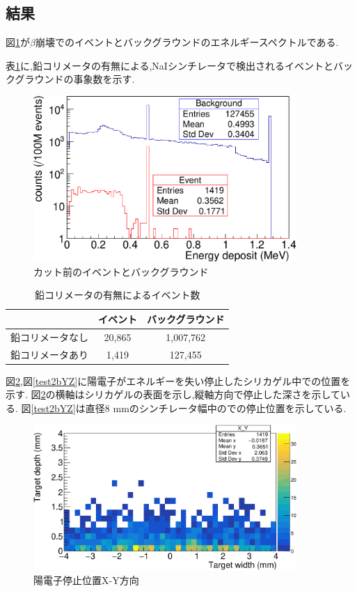 \subsection{結果}

図\ref{test2}が$\beta$崩壊でのイベントとバックグラウンドのエネルギースペクトルである.

表\ref{table_test2}に,鉛コリメータの有無による,NaIシンチレータで検出されるイベントとバックグラウンドの事象数を示す.


\begin{figure}[htbp]
	\centering
		\includegraphics[width=10cm]{fig/test2.pdf}
	\caption{カット前のイベントとバックグラウンド}
	\label{test2}
\end{figure}

\begin{table}[htbp]
	\centering
	\caption{鉛コリメータの有無によるイベント数}
		\label{table_test2}	
	  \begin{tabular}{ccc} 
		\hline
		   				&イベント& バックグラウンド \\ 
		\hline \hline
		鉛コリメータなし & 20,865 & 1,007,762 \\
		鉛コリメータあり & 1,419  & 127,455   \\
		\hline
	  \end{tabular}
\end{table}

図\ref{test2bXY},図\ref{test2bYZ}に陽電子がエネルギーを失い停止したシリカゲル中での位置を示す.
図\ref{test2bXY}の横軸はシリカゲルの表面を示し,縦軸方向で停止した深さを示している.
図\ref{test2bYZ}は直径8 mmのシンチレータ幅中のでの停止位置を示している.

\begin{figure}[htbp]
	\centering
		\includegraphics[width=10cm]{fig/test2bXY.pdf}
	\caption{陽電子停止位置X-Y方向}
	\label{test2bXY}
\end{figure}


